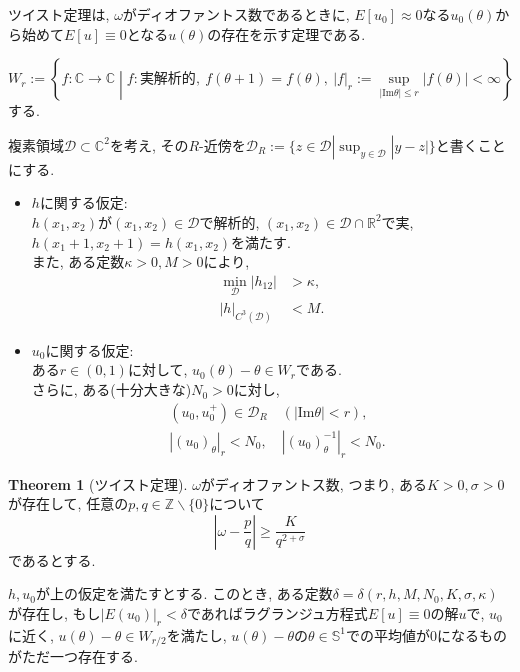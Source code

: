 \documentclass[a4paper]{ujarticle}
\numberwithin{equation}{section}
\theoremstyle{definition}
\newtheorem{theorem}{Theorem}
\begin{document}
        ツイスト定理は, $\omega$がディオファントス数であるときに,
        $E[u_0] \approx 0$なる$u_0(\theta)$から始めて$E[u] \equiv 0$となる$u(\theta)$の存在を示す定理である.
        
        \[
            W_r := \left\{f: \mathbb{C} \rightarrow \mathbb{C} \middle| f : \text{実解析的}, \ f(\theta + 1) = f(\theta), \ |f|_r := \sup_{|\mathrm{Im} \theta| \leq r} |f(\theta)| < \infty \right\}
        \]
        する.

        複素領域$\mathcal{D} \subset \mathbb{C}^2$を考え, その$R$-近傍を$\mathcal{D}_{R} := \{z \in \mathcal{D} | \sup_{y \in \mathcal{D}}|y - z| \}$と書くことにする.
        \begin{itemize}
            \item $h$に関する仮定: \\
            $h(x_1, x_2)$が$(x_1, x_2) \in \mathcal{D}$で解析的, $(x_1, x_2) \in \mathcal{D} \cap \mathbb{R}^2$で実, 
            $h(x_1 + 1, x_2 + 1) = h(x_1, x_2)$を満たす. \\
            また, ある定数$\kappa > 0, M > 0$により, 
            \begin{align}
                \min_{\mathcal{D}} |h_{12}| &> \kappa, \label{eq:5} \\
                |h|_{C^3(\mathcal{D})} &< M. \label{eq:6}
            \end{align}
            \item $u_0$に関する仮定: \\
            ある$r \in (0, 1)$に対して, $u_0(\theta) - \theta \in W_r$である. \\
            さらに, ある(十分大きな)$N_0 > 0$に対し, 
            \begin{align}
                &(u_0, u^{+}_0) \in \mathcal{D}_{R} \quad (|\mathrm{Im} \theta| < r) \label{eq:7}, \\
                &|(u_0)_{\theta}|_r < N_0, \quad |(u_0)^{-1}_{\theta}|_r < N_0. \label{eq:8}
            \end{align}
        \end{itemize}

        \begin{theorem}[ツイスト定理]
            $\omega$がディオファントス数, つまり, ある$K > 0, \sigma > 0$が存在して, 
            任意の$p, q \in \mathbb{Z} \backslash \{0\}$について
            \begin{equation} \label{eq:9}
                |\omega - \frac{p}{q}| \geq \frac{K}{q^{2 + \sigma}}
            \end{equation}
            であるとする.

            $h, u_0$が上の仮定を満たすとする. このとき, ある定数$\delta = \delta(r, h, M, N_0, K, \sigma, \kappa)$が存在し,
            もし$|E(u_0)|_r < \delta$であればラグランジュ方程式$E[u] \equiv 0$の解$u$で, $u_0$に近く, $u(\theta) - \theta \in W_{r/2}$を満たし, 
            $u(\theta) - \theta$の$\theta \in \mathbb{S}^1$での平均値が$0$になるものがただ一つ存在する.
        \end{theorem}
\end{document}
